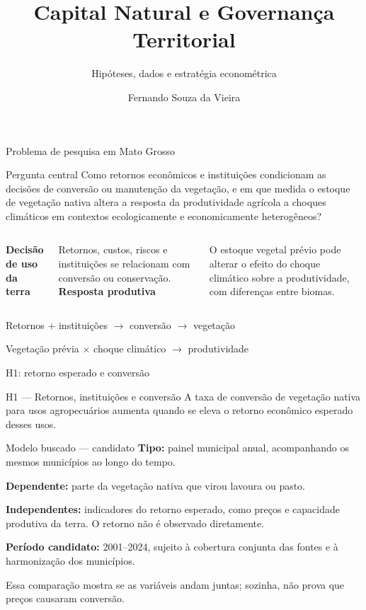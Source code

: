 \documentclass[aspectratio=169,11pt]{beamer}
\title[Capital natural e governança territorial]{Capital Natural e Governança Territorial}
\subtitle{Hipóteses, dados e estratégia econométrica}
\author{Fernando Souza da Vieira}
\institute{Tópicos de Microeconomia}
\date{}
\newcommand{\fonte}[1]{\par\vfill{\fontsize{7.5}{9}\selectfont\color{gray}#1\par}}
\begin{document}
\begin{frame}
  \titlepage
\end{frame}

\begin{frame}{Problema de pesquisa em Mato Grosso}
\begin{block}{Pergunta central}
Como retornos econômicos e instituições condicionam as decisões de conversão ou manutenção da vegetação, e em que medida o estoque de vegetação nativa altera a resposta da produtividade agrícola a choques climáticos em contextos ecologicamente e economicamente heterogêneos?
\end{block}
\medskip
\begin{columns}[T]
\textbf{Decisão de uso da terra}\par\smallskip
Retornos, custos, riscos e instituições se relacionam com conversão ou conservação.
\textbf{Resposta produtiva}\par\smallskip
O estoque vegetal prévio pode alterar o efeito do choque climático sobre a produtividade, com diferenças entre biomas.
\end{columns}
\medskip
\centering\small\color{verde}
Retornos + instituições $\rightarrow$ conversão $\rightarrow$ vegetação\par
Vegetação prévia $\times$ choque climático $\rightarrow$ produtividade
\end{frame}

\begin{frame}{H1: retorno esperado e conversão}
\begin{block}{H1 — Retornos, instituições e conversão}
A taxa de conversão de vegetação nativa para usos agropecuários aumenta quando se eleva o retorno econômico esperado desses usos.
\end{block}
\medskip
\begin{block}{Modelo buscado — candidato}
\textbf{Tipo:} painel municipal anual, acompanhando os mesmos municípios ao longo do tempo.\par
\textbf{Dependente:} parte da vegetação nativa que virou lavoura ou pasto.\par
\textbf{Independentes:} indicadores do retorno esperado, como preços e capacidade produtiva da terra. O retorno não é observado diretamente.\par
\textbf{Período candidato:} 2001--2024, sujeito à cobertura conjunta das fontes e à harmonização dos municípios.
\end{block}
\fonte{Essa comparação mostra se as variáveis andam juntas; sozinha, não prova que preços causaram conversão.}
\end{frame}
\end{document}
